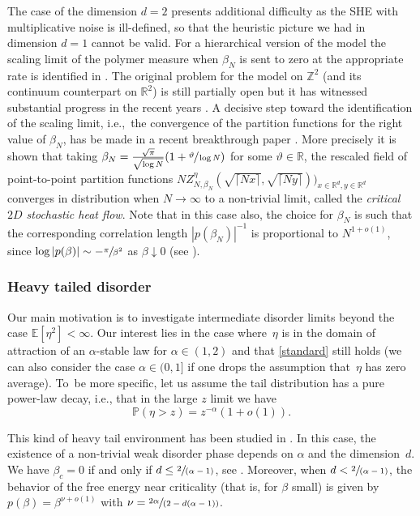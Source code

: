 \documentclass[11pt]{article}
\newcommand{\ie}{i.e.,\xspace}
\numberwithin{equation}{section}
\newcommand{\spfrac}[2]{\sfrac{#1}{(#2)}}
\theoremstyle{definition}
\newcommand{\bbE}{{\ensuremath{\mathbb E}} }
\newcommand{\bbP}{{\ensuremath{\mathbb P}} }
\newcommand{\bbR}{{\ensuremath{\mathbb R}} }
\newcommand{\bbZ}{{\ensuremath{\mathbb Z}} }
\let\ga\alpha
\let\gb\beta
\begin{document}
The case of the dimension $d=2$ presents additional difficulty as the SHE with multiplicative noise is ill-defined, so that the heuristic picture we had in dimension $d=1$ cannot be valid.
For a hierarchical version of the model
the scaling limit of the polymer measure when $\beta_N$ is sent to zero at the appropriate rate is identified in \cite{clark2019}. The original problem for the model on $\bbZ^2$ (and its continuum counterpart on $\bbR^2$) is still partially open but it has witnessed substantial progress in the recent years \cite{CSZ15, CSZ18scaling, gu2019}. A decisive step toward the identification of the scaling limit, \ie \ the convergence of the partition functions for the right value of $\beta_N$, has be made in a recent breakthrough paper \cite{CSZ21}.
More precisely it is shown that taking
$\beta_N = \frac{\sqrt{\pi}}{\sqrt{\log N}} (1+ \sfrac{\vartheta}{\log N})$ for some $\vartheta\in \bbR$,
the rescaled
field of point-to-point partition functions
$N Z^{\eta}_{N, \beta_N}(\sqrt{\lceil Nx\rceil},\sqrt{\lceil Ny \rceil}))_{x\in \bbR^d, y\in \bbR^d}$ converges in distribution when $N\to \infty$ to a non-trivial limit, called the \emph{critical $2D$ stochastic heat flow}.
Note that in this case also, the choice for $\beta_N$ is such that the corresponding correlation length $|p(\beta_N)|^{-1}$ is proportional to $N^{1+o(1)}$,
since $\log |p(\beta)| \sim - \sfrac{\pi}{\gb^2}$ as $\gb\downarrow0$ (see \cite{BL17}).

\subsubsection*{Heavy tailed disorder}
Our main motivation is to investigate intermediate disorder limits beyond the case $\bbE[ \eta^2]<\infty$.
Our interest lies in the case where~$\eta$ is in the domain of attraction of an $\alpha$-stable law for $\alpha\in (1,2)$ and that \eqref{standard} still holds (we can also consider the case $\alpha\in(0,1]$ if one drops the assumption that~$\eta$ has zero average). To~be more specific, let us assume the tail distribution has a pure power-law decay, \ie that in the large $z$ limit we have
\begin{equation}
\label{def:eta}
\bbP(\eta> z) = z^{-\alpha}(1+o(1)).
\end{equation}

This kind of heavy tail environment has been studied in \cite{Vi19}. In this case, the existence of a non-trivial weak disorder phase depends on $\alpha$ and the dimension~$d$. We have $\gb_c=0$
if and only if $d\leq \spfrac{2}{\ga-1}$,
see \cite[Th.\,1.1]{Vi19}.
Moreover, when $d<\nobreak \spfrac{2}{\alpha-1}$,
the behavior of the free energy near criticality (that is, for $\beta$ small) is given by
$p(\beta)=\beta^{\nu+o(1)}$ with $\nu =\spfrac{2\alpha}{2-d(\alpha-1)}$.
\end{document}
